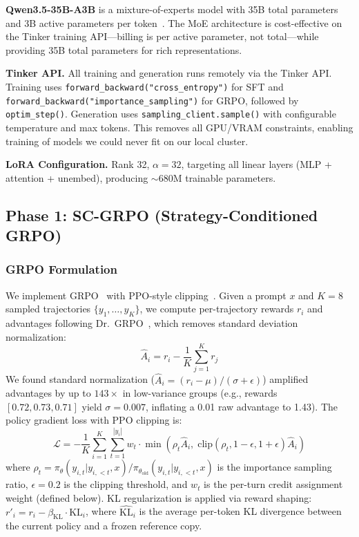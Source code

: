 \documentclass{article}
\begin{document}
\textbf{Qwen3.5-35B-A3B} is a mixture-of-experts model with 35B total parameters and 3B active parameters per token~\cite{qwen35}. The MoE architecture is cost-effective on the Tinker training API---billing is per active parameter, not total---while providing 35B total parameters for rich representations.

\textbf{Tinker API.} All training and generation runs remotely via the Tinker API. Training uses \texttt{forward\_backward("cross\_entropy")} for SFT and \texttt{forward\_backward("importance\_sampling")} for GRPO, followed by \texttt{optim\_step()}. Generation uses \texttt{sampling\_client.sample()} with configurable temperature and max tokens. This removes all GPU/VRAM constraints, enabling training of models we could never fit on our local cluster.

\textbf{LoRA Configuration.} Rank 32, $\alpha{=}32$, targeting all linear layers (MLP + attention + unembed), producing $\sim$680M trainable parameters.

\subsection{Phase 1: SC-GRPO (Strategy-Conditioned GRPO)}
\label{sec:sc-grpo}

\subsubsection{GRPO Formulation}

We implement GRPO~\cite{deepseekr1} with PPO-style clipping~\cite{schulman2017ppo}. Given a prompt $x$ and $K{=}8$ sampled trajectories $\{y_1, \ldots, y_K\}$, we compute per-trajectory rewards $r_i$ and advantages following Dr.~GRPO~\cite{drgrpo}, which removes standard deviation normalization:
\begin{equation}
\hat{A}_i = r_i - \frac{1}{K}\sum_{j=1}^K r_j
\label{eq:advantage}
\end{equation}
We found standard normalization ($\hat{A}_i = (r_i - \mu) / (\sigma + \epsilon)$) amplified advantages by up to $143{\times}$ in low-variance groups (e.g., rewards $[0.72, 0.73, 0.71]$ yield $\sigma{=}0.007$, inflating a 0.01 raw advantage to 1.43). The policy gradient loss with PPO clipping is:
\begin{equation}
\mathcal{L} = -\frac{1}{K}\sum_{i=1}^K \sum_{t=1}^{|y_i|} w_t \cdot \min\!\left(\rho_t \hat{A}_i,\; \text{clip}(\rho_t, 1{-}\epsilon, 1{+}\epsilon)\hat{A}_i\right)
\label{eq:ppo}
\end{equation}
where $\rho_t = \pi_\theta(y_{i,t} | y_{i,<t}, x) / \pi_{\theta_\text{old}}(y_{i,t} | y_{i,<t}, x)$ is the importance sampling ratio, $\epsilon{=}0.2$ is the clipping threshold, and $w_t$ is the per-turn credit assignment weight (defined below). KL regularization is applied via reward shaping: $r'_i = r_i - \beta_\text{KL} \cdot \widehat{\text{KL}}_i$, where $\widehat{\text{KL}}_i$ is the average per-token KL divergence between the current policy and a frozen reference copy.
\end{document}
